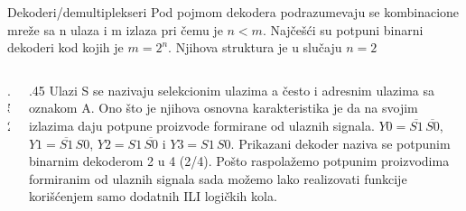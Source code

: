 \begin{frame}[label=03-s005]{Dekoderi/demultiplekseri}
\gusttekst
Pod pojmom dekodera podrazumevaju se kombinacione mreže sa n ulaza i m izlaza pri čemu je \(n<m\). Najčešći su potpuni binarni dekoderi kod kojih je \(m=2^n\). Njihova struktura je u slučaju \(n=2\)
\begin{columns}[c,onlytextwidth]
\begin{column}{.52\textwidth}\centering

\end{column}
\begin{column}{.45\textwidth}
Ulazi S se nazivaju selekcionim ulazima a često i adresnim ulazima sa oznakom A. Ono što je njihova osnovna karakteristika je da na svojim izlazima daju potpune proizvode formirane od ulaznih signala.
\(Y0=\overline{S1}\,\overline{S0}\), \(Y1=\overline{S1}\,S0\), \(Y2=S1\,\overline{S0}\) i \(Y3=S1\,S0\).
Prikazani dekoder naziva se potpunim binarnim dekoderom 2 u 4 (2/4). Pošto raspolažemo potpunim proizvodima formiranim od ulaznih signala sada možemo lako realizovati funkcije korišćenjem samo dodatnih ILI logičkih kola.
\end{column}
\end{columns}
\end{frame}
